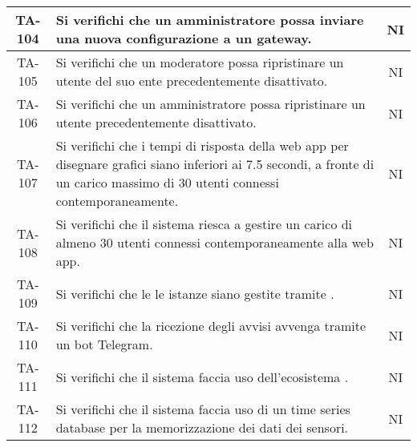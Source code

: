 \begin{center}
\begin{longtable}{|c|p{10cm}|c|}
			 \hline
			 TA-104 & Si verifichi che un amministratore possa inviare una nuova configurazione a un gateway. & NI \\
			 \hline
			 TA-105 & Si verifichi che un moderatore possa ripristinare un utente del suo ente precedentemente disattivato. & NI \\
			 \hline
			 TA-106 & Si verifichi che un amministratore possa ripristinare un utente precedentemente disattivato. & NI \\
			 \hline
			 TA-107 & Si verifichi che i tempi di risposta della web app per disegnare grafici siano inferiori ai 7.5 secondi, a fronte di un carico massimo di 30 utenti connessi contemporaneamente. & NI \\
			 \hline
			 TA-108 & Si verifichi che il sistema riesca a gestire un carico di almeno 30 utenti connessi contemporaneamente alla web app. & NI \\
			 \hline
			 TA-109 & Si verifichi che le le istanze siano gestite tramite \glock{Docker}. & NI \\
			 \hline
			 TA-110 & Si verifichi che la ricezione degli avvisi avvenga tramite un bot Telegram. & NI \\
			 \hline
			 TA-111 & Si verifichi che il sistema faccia uso dell'ecosistema \glock{Kafka}. & NI \\
			 \hline
			 TA-112 & Si verifichi che il sistema faccia uso di un time series database per la memorizzazione dei dati dei sensori. & NI \\

\end{longtable}
\end{center}
